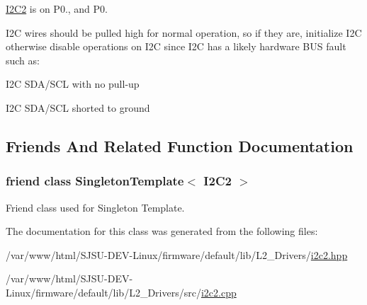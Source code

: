\hyperlink{classI2C2}{I2\+C2} is on P0., and P0.

I2C wires should be pulled high for normal operation, so if they are, initialize I2C otherwise disable operations on I2C since I2C has a likely hardware B\+US fault such as\+:
\begin{DoxyItemize}
\item I2C S\+D\+A/\+S\+CL with no pull-\/up
\item I2C S\+D\+A/\+S\+CL shorted to ground
\end{DoxyItemize}

\subsection{Friends And Related Function Documentation}
\subsubsection[{\texorpdfstring{Singleton\+Template$<$ I2\+C2 $>$}{SingletonTemplate< I2C2 >}}]{\setlength{\rightskip}{0pt plus 5cm}friend class {\bf Singleton\+Template}$<$ {\bf I2\+C2} $>$\hspace{0.3cm}{\ttfamily [friend]}}\hypertarget{classI2C2_a7321868b283eed05e13be0111783a968}{}\label{classI2C2_a7321868b283eed05e13be0111783a968}


Friend class used for Singleton Template. 



The documentation for this class was generated from the following files\+:\begin{DoxyCompactItemize}
\item 
/var/www/html/\+S\+J\+S\+U-\/\+D\+E\+V-\/\+Linux/firmware/default/lib/\+L2\+\_\+\+Drivers/\hyperlink{i2c2_8hpp}{i2c2.\+hpp}\item 
/var/www/html/\+S\+J\+S\+U-\/\+D\+E\+V-\/\+Linux/firmware/default/lib/\+L2\+\_\+\+Drivers/src/\hyperlink{i2c2_8cpp}{i2c2.\+cpp}\end{DoxyCompactItemize}
